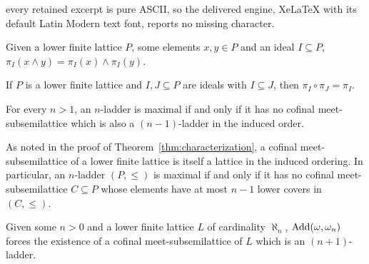 \documentclass[10pt,a4paper]{amsart}
\begin{document}
every retained excerpt is pure ASCII, so the delivered engine, XeLaTeX with its default Latin Modern text font, reports no missing character.
\begin{lemma}\label{lemma:meetproj}
Given a lower finite lattice $P$, some elements $x,y \in P$ and an ideal $I \subseteq P$, $\pi_I(x \wedge y) = \pi_I(x) \wedge \pi_I(y)$.
\end{lemma}

\begin{lemma}\label{lemma:concproj}
If $P$ is a lower finite lattice and $I,J \subseteq P$ are ideals with $I \subseteq J$, then $\pi_I \circ \pi_J = \pi_I$.
\end{lemma}

\begin{theorem}\label{thm:characterization}
For every $n > 1$, an $n$-ladder is maximal if and only if it has no cofinal meet-subsemilattice which is also a $(n-1)$-ladder in the induced order.
\end{theorem}

\begin{remark}\label{rmk:cofinalmeet}
As noted in the proof of Theorem~\ref{thm:characterization}, a cofinal meet-subsemilattice of a lower finite lattice is itself a lattice in the induced ordering. In particular, an $n$-ladder $(P, \le) $ is maximal if and only if it has no cofinal meet-subsemilattice $C \subseteq P$ whose elements have at most $n-1$ lower covers in $(C, \le)$.
\end{remark}

\begin{proposition}\label{prop:wehrung}
Given some $n > 0$ and a lower finite lattice $L$ of cardinality $\aleph_n$, $\text{\upshape Add}(\omega, \omega_n)$ forces the existence of a cofinal meet-subsemilattice of $L$ which is an $(n+1)$-ladder.
\end{proposition}
\end{document}
